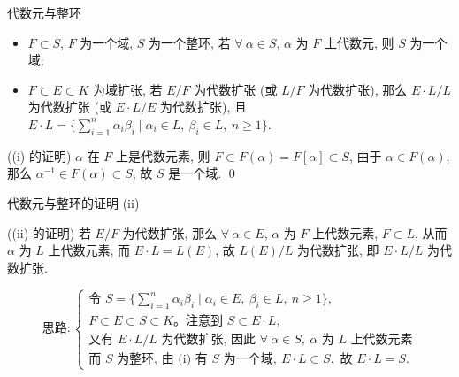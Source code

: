 
\begin{frame}{代数元与整环}

\begin{lem}[代数元与整环]
\begin{itemize}
\item[(i)] $F \subset S$, $F$ 为一个域, $S$ 为一个整环,
  若 $\forall\ \alpha \in S$, $\alpha$ 为 $F$ 上代数元, 则 $S$ 为一个域;
\item[(ii)] $F \subset E \subset K$ 为域扩张, 若 $E/F$ 为代数扩张
  (或 $L/F$ 为代数扩张),
  那么 $E \cdot L/L$ 为代数扩张 (或 $E \cdot L/E$ 为代数扩张),
  且 $E \cdot L = \{ \sum_{i=1}^{n} \alpha_i \beta_i \mid \alpha_i \in L,\
  \beta_i \in L,\ n \geq 1 \}$.
\end{itemize}
\end{lem}


\startproof[bg=yellow, fg=red]((i) 的证明)
$\alpha$ 在 $F$ 上是代数元素, 则 $F \subset F(\alpha) = F[\alpha] \subset S$,
由于 $\alpha \in F(\alpha)$, 那么 $\alpha^{-1} \in F(\alpha) \subset S$,
故 $S$ 是一个域.
\qed

\end{frame}


\begin{frame}{代数元与整环的证明 (ii)}

\startproof[bg=yellow, fg=red]((ii) 的证明)
若 $E/F$ 为代数扩张, 那么 $\forall\ \alpha \in E$, $\alpha$ 为 $F$ 上代数元素,
$F \subset L$, 从而 $\alpha$ 为 $L$ 上代数元素, 而 $E \cdot L = L(E)$,
故 $L(E)/L$ 为代数扩张, 即 $E \cdot L/L$ 为代数扩张.

\pause

\[
\text{思路}:
\begin{cases}
\text{令 } S = \{ \sum_{i=1}^{n} \alpha_i \beta_i \mid \alpha_i \in E,\
\beta_i \in L,\ n \geq 1 \}, \\
F \subset E \subset S \subset K\text{。注意到 } S \subset E \cdot L, \\
\text{又有 } E \cdot L/L \text{ 为代数扩张, 因此 } \forall\ \alpha \in S,\
\alpha \text{ 为 } L \text{ 上代数元素} \\
\text{而 } S \text{ 为整环, 由 (i) 有 } S \text{ 为一个域},\
E \cdot L \subset S, \text{ 故 } E \cdot L = S.
\end{cases}
\]

\end{frame}

